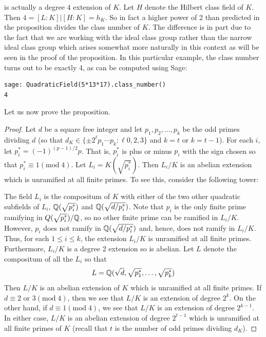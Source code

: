 \documentclass{book}
\begin{document}
is actually a degree $4$ extension of $K$.  Let $H$ denote the Hilbert class
field of $K$.  Then $4 = [L:K]|[H:K] = h_K$.  So in fact a higher power of 2
than predicted in the proposition divides the class number of $K$.  The
difference is in part due to the fact that we are working with the ideal
class group rather than the narrow ideal class group which arises somewhat
more naturally in this context as will be seen in the proof of the
proposition.  In this particular example, the class number turns out to be
exactly 4, as can be computed using Sage:
\begin{lstlisting}
sage: QuadraticField(5*13*17).class_number()
4
\end{lstlisting}
Let us now prove the proposition.
\begin{proof} Let $d$ be a square free integer and let $p_1, p_2,
\ldots, p_k$ be the odd primes dividing $d$ (so that $d_K \in
\{\pm 2^{\ell}p_1 \cdots p_k: \ell 0, 2, 3\}$ and $k = t$ or
$k = t - 1$).  For each $i$, let
$p_i^* = (-1)^{(p-1)/2}p$.  That is, $p_i^*$ is plus or minus
$p_i$ with the sign chosen so that $p_i^* \equiv 1 (\mathrm{mod}
\; 4)$.  Let $L_i = K(\sqrt{p_i^*})$.  Then $L_i/K$ is an abelian
extension which is unramified at all finite primes.  To see this,
consider the following tower:

\begin{center}
\end{center}

The field $L_i$ is the compositum of $K$ with either of the two
other quadratic subfields of $L_i$, $\mathbb{Q}(\sqrt{p_i^*})$ and
$\mathbb{Q}(\sqrt{d/p_i^*})$.  Note that $p_i$ is the only finite prime
ramifying in $Q(\sqrt{p_i^*})/\mathbb{Q}$, so no other finite prime can
be ramified in $L_i/K$.  However, $p_i$ does not ramify in
$\mathbb{Q}(\sqrt{d/p_i^*})$ and, hence, does not ramify in $L_i/K$.
Thus, for each $1 \leq i \leq k$, the extension $L_i/K$ is
unramified at all finite primes.  Furthermore, $L_i/K$ is a
degree 2 extension so is abelian.  Let $L$ denote the compositum
of all the $L_i$ so that
$$
L = \mathbb{Q}(\sqrt{d}, \sqrt{p_1^*}, \ldots, \sqrt{p_k^*})
$$
Then $L/K$ is an abelian extension of $K$ which is unramified at
all finite primes.  If $d \equiv 2$ or $3 (\mathrm{mod} \; 4)$,
then we see that $L/K$ is an extension of degree $2^k$.
On the other hand, if $d \equiv 1 (\mathrm{mod} \; 4)$, we see
that $L/K$ is an extension of degree $2^{k-1}$.  In either case,
$L/K$ is an abelian extension of degree $2^{t-1}$ which is
unramified at all finite primes of $K$ (recall that $t$ is the
number of odd primes dividing $d_K$).


\end{proof}
\end{document}
